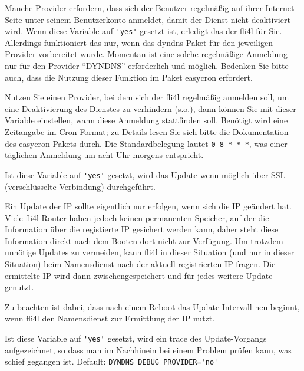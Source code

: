 \begin{description}

Manche Provider erfordern, dass sich der Benutzer regelmäßig auf ihrer
Internet-Seite unter seinem Benutzerkonto anmeldet, damit der Dienst nicht
deaktiviert wird. Wenn diese Variable auf \verb*?'yes'? gesetzt ist, erledigt
das der fli4l für Sie. Allerdings funktioniert das nur, wenn das dyndns-Paket
für den jeweiligen Provider vorbereitet wurde. Momentan ist eine solche
regelmäßige Anmeldung nur für den Provider ``DYNDNS'' erforderlich und möglich.
Bedenken Sie bitte auch, dass die Nutzung dieser Funktion
 im Paket easycron erfordert.


Nutzen Sie einen Provider, bei dem sich der fli4l regelmäßig anmelden soll,
um eine Deaktivierung des Dienstes zu verhindern (s.o.), dann können Sie mit
dieser Variable einstellen, wann diese Anmeldung stattfinden soll. Benötigt
wird eine Zeitangabe im Cron-Format; zu Details lesen Sie sich bitte die
Dokumentation des easycron-Pakets durch. Die Standardbelegung lautet
\texttt{0 8 * * *}, was einer täglichen Anmeldung um acht Uhr morgens
entspricht.


Ist diese Variable auf \verb*?'yes'? gesetzt, wird das Update wenn möglich
über SSL (verschlüsselte Verbindung) durchgeführt.

Ein Update der IP sollte eigentlich nur erfolgen, wenn sich die IP
geändert hat. Viele fli4l-Router haben jedoch keinen permanenten
Speicher, auf der die Information über die registierte IP gesichert
werden kann, daher steht diese Information direkt nach dem Booten dort
nicht zur Verfügung. Um trotzdem unnötige Updates zu vermeiden, kann
fli4l in dieser Situation (und nur in dieser Situation) beim
Namensdienst nach der aktuell registrierten IP fragen. Die ermittelte
IP wird dann zwischengespeichert und für jedes weitere Update genutzt.

Zu beachten ist dabei, dass nach einem Reboot das Update-Intervall neu
beginnt, wenn fli4l den Namensdienst zur Ermittlung der IP nutzt.


Ist   diese  Variable   auf  \verb*?'yes'?   gesetzt,  wird   ein   trace  des
Update-Vorgangs  aufgezeichnet, so  dass man  im Nachhinein  bei einem
Problem prüfen kann, was schief gegangen ist. 
Default: \verb*?DYNDNS_DEBUG_PROVIDER='no'?


\end{description}
